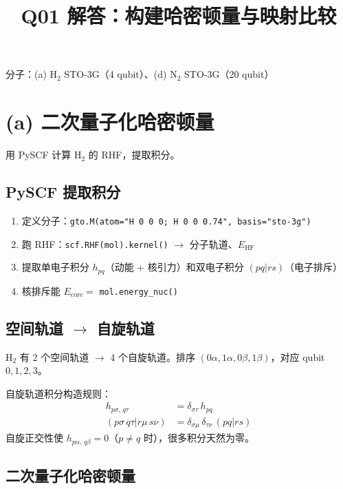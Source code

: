 \documentclass[11pt,a4paper]{article}
\title{Q01 解答：构建哈密顿量与映射比较}
\author{}
\date{}
\begin{document}
\maketitle

分子：(a) H$_2$ STO-3G（4 qubit）、(d) N$_2$ STO-3G（20 qubit）

\section{(a) 二次量子化哈密顿量}

用 PySCF 计算 H$_2$ 的 RHF，提取积分。

\subsection{PySCF 提取积分}

\begin{enumerate}[label=\arabic*.]
  \item 定义分子：\texttt{gto.M(atom="H 0 0 0; H 0 0 0.74", basis="sto-3g")}
  \item 跑 RHF：\texttt{scf.RHF(mol).kernel()} $\to$ 分子轨道、$E_{\text{HF}}$
  \item 提取单电子积分 $h_{pq}$（动能 + 核引力）和双电子积分 $(pq|rs)$（电子排斥）
  \item 核排斥能 $E_{\text{core}} = $ \texttt{mol.energy\_nuc()}
\end{enumerate}

\subsection{空间轨道 $\to$ 自旋轨道}

H$_2$ 有 2 个空间轨道 $\to$ 4 个自旋轨道。排序 $(0\alpha, 1\alpha, 0\beta, 1\beta)$，对应 qubit $0,1,2,3$。

自旋轨道积分构造规则：
\begin{align}
  h_{p\sigma,\, q\tau} &= \delta_{\sigma\tau}\, h_{pq} \label{eq:spin1}\\
  (p\sigma\, q\tau | r\mu\, s\nu) &= \delta_{\sigma\mu}\, \delta_{\tau\nu}\, (pq|rs) \label{eq:spin2}
\end{align}
自旋正交性使 $h_{p\alpha,\, q\beta} = 0$（$p \neq q$ 时），很多积分天然为零。

\subsection{二次量子化哈密顿量}
\end{document}
